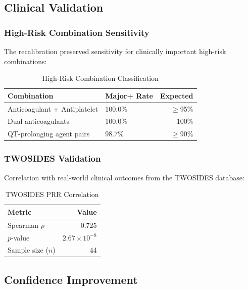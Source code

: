 \documentclass[11pt,a4paper]{article}
\begin{document}
\subsection{Clinical Validation}

\subsubsection{High-Risk Combination Sensitivity}

The recalibration preserved sensitivity for clinically important high-risk combinations:

\begin{table}[H]
\centering
\caption{High-Risk Combination Classification}
\label{tab:high_risk}
\begin{tabular}{@{}llr@{}}
\toprule
\textbf{Combination} & \textbf{Major+ Rate} & \textbf{Expected} \\
\midrule
Anticoagulant + Antiplatelet & 100.0\% & $\geq$95\% \\
Dual anticoagulants & 100.0\% & 100\% \\
QT-prolonging agent pairs & 98.7\% & $\geq$90\% \\
\bottomrule
\end{tabular}
\end{table}

\subsubsection{TWOSIDES Validation}

Correlation with real-world clinical outcomes from the TWOSIDES database:

\begin{table}[H]
\centering
\caption{TWOSIDES PRR Correlation}
\label{tab:twosides}
\begin{tabular}{@{}lr@{}}
\toprule
\textbf{Metric} & \textbf{Value} \\
\midrule
Spearman $\rho$ & 0.725 \\
$p$-value & $2.67 \times 10^{-8}$ \\
Sample size ($n$) & 44 \\
\bottomrule
\end{tabular}
\end{table}

\subsection{Confidence Improvement}
\end{document}
